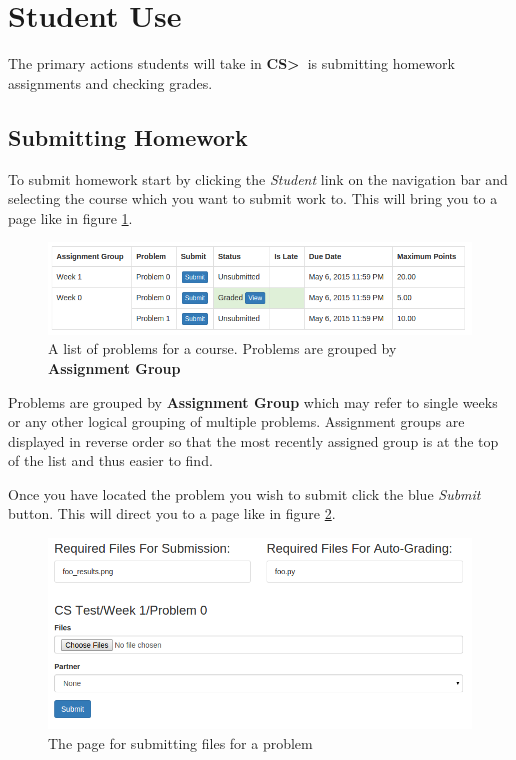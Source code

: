 \documentclass[11pt]{report}
\newcommand{\csgt}[0]{\textbf{CS\textgreater\ }}
\begin{document}
\section{Student Use}
The primary actions students will take in \csgt is submitting homework assignments and checking grades.

\subsection{Submitting Homework}
To submit homework start by clicking the \emph{Student} link on the navigation bar and selecting the course
which you want to submit work to. This will bring you to a page like in figure \ref{fig:problem_list}.

\begin{figure}[h]
\centering
\includegraphics[width=\textwidth,height=\textheight,keepaspectratio]{diagrams/problem_list}
\caption{A list of problems for a course. Problems are grouped by \textbf{Assignment Group}}
\label{fig:problem_list}
\end{figure}

Problems are grouped by \textbf{Assignment Group} which may refer to single weeks or any other logical
grouping of multiple problems. Assignment groups are displayed in reverse order so that the most recently
assigned group is at the top of the list and thus easier to find.

Once you have located the problem you wish to submit click the blue \emph{Submit} button. This will direct
you to a page like in figure \ref{fig:submit_page}.

\begin{figure}
\centering
\includegraphics[width=\textwidth,height=\textheight,keepaspectratio]{diagrams/submit_page}
\caption{The page for submitting files for a problem}
\label{fig:submit_page}
\end{figure}
\end{document}
